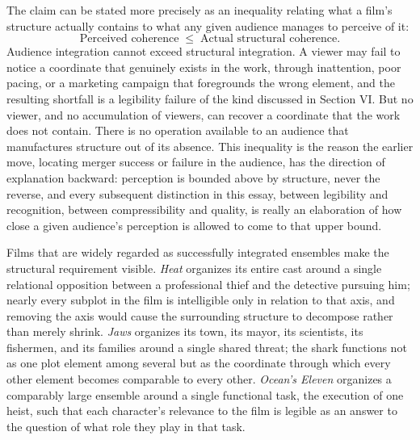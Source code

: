 \documentclass[11pt]{article}
\begin{document}
The claim can be stated more precisely as an inequality relating what a film's structure actually contains to what any given audience manages to perceive of it:
\[
\text{Perceived coherence} \;\leq\; \text{Actual structural coherence}.
\]
Audience integration cannot exceed structural integration. A viewer may fail to notice a coordinate that genuinely exists in the work, through inattention, poor pacing, or a marketing campaign that foregrounds the wrong element, and the resulting shortfall is a legibility failure of the kind discussed in Section VI. But no viewer, and no accumulation of viewers, can recover a coordinate that the work does not contain. There is no operation available to an audience that manufactures structure out of its absence. This inequality is the reason the earlier move, locating merger success or failure in the audience, has the direction of explanation backward: perception is bounded above by structure, never the reverse, and every subsequent distinction in this essay, between legibility and recognition, between compressibility and quality, is really an elaboration of how close a given audience's perception is allowed to come to that upper bound.

Films that are widely regarded as successfully integrated ensembles make the structural requirement visible. \emph{Heat} organizes its entire cast around a single relational opposition between a professional thief and the detective pursuing him; nearly every subplot in the film is intelligible only in relation to that axis, and removing the axis would cause the surrounding structure to decompose rather than merely shrink. \emph{Jaws} organizes its town, its mayor, its scientists, its fishermen, and its families around a single shared threat; the shark functions not as one plot element among several but as the coordinate through which every other element becomes comparable to every other. \emph{Ocean's Eleven} organizes a comparably large ensemble around a single functional task, the execution of one heist, such that each character's relevance to the film is legible as an answer to the question of what role they play in that task.
\end{document}
